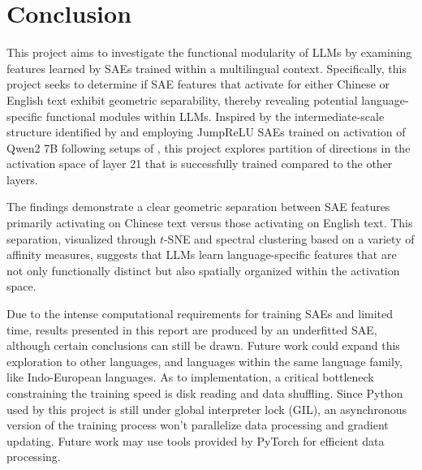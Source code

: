 \documentclass{article}
\begin{document}
\section{Conclusion}
\label{sec:conclusion}

This project aims to investigate the functional modularity of LLMs by examining features learned by
SAEs trained within a multilingual context. Specifically, this project seeks to determine if SAE
features that activate for either Chinese or English text exhibit geometric separability, thereby
revealing potential language-specific functional modules within LLMs. Inspired by the
intermediate-scale structure identified by \cite{li2024Geometry} and employing JumpReLU SAEs trained
on activation of Qwen2 7B following setups of \cite{lieberum2024Gemma}, this project explores
partition of directions in the activation space of layer 21 that is successfully trained compared to
the other layers.

The findings demonstrate a clear geometric separation between SAE features primarily activating on
Chinese text versus those activating on English text. This separation, visualized through \(t\)-SNE
and spectral clustering based on a variety of affinity measures, suggests that LLMs learn
language-specific features that are not only functionally distinct but also spatially organized
within the activation space.

Due to the intense computational requirements for training SAEs and limited time, results presented
in this report are produced by an underfitted SAE, although certain conclusions can still be
drawn. Future work could expand this exploration to other languages, and languages within the same
language family, like Indo-European languages. As to implementation, a critical bottleneck
constraining the training speed is disk reading and data shuffling. Since Python used by this
project is still under global interpreter lock (GIL), an asynchronous version of the training
process won't parallelize data processing and gradient updating. Future work may use tools provided
by PyTorch for efficient data processing.



\end{document}
